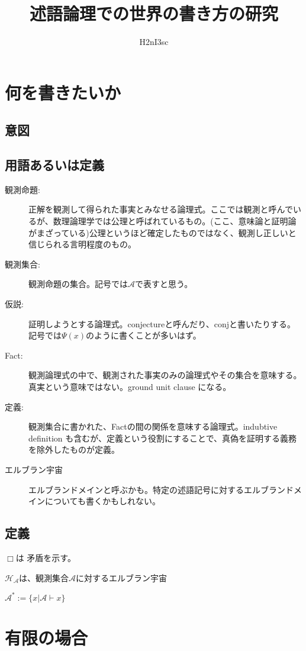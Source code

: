 \documentclass[10pt, oneside]{jarticle}   	%
\title{述語論理での世界の書き方の研究}
\author{H2nI3sc}
\theoremstyle{definition}
\newcommand{\cont}{\Box}
\newcommand{\clos}[1]{\mathcal{#1}^{*}}
\begin{document}
\maketitle

\section{何を書きたいか}
\subsection{意図}


\subsection{用語あるいは定義}
\begin{description}
\item[観測命題:] 正解を観測して得られた事実とみなせる論理式。ここでは観測と呼んでいるが、数理論理学では公理と呼ばれているもの。(ここ、意味論と証明論がまざっている)公理というほど確定したものではなく、観測し正しいと信じられる言明程度のもの。
\item[観測集合:] 観測命題の集合。記号では$\mathcal{A}$で表すと思う。
\item[仮説:] 証明しようとする論理式。conjectureと呼んだり、conjと書いたりする。記号では$\Psi(x)$のように書くことが多いはず。
\item[Fact:] 観測論理式の中で、観測された事実のみの論理式やその集合を意味する。真実という意味ではない。ground unit clause になる。
\item[定義:] 観測集合に書かれた、Factの間の関係を意味する論理式。indubtive definition も含むが、定義という役割にすることで、真偽を証明する義務を除外したものが定義。
\item[エルブラン宇宙] エルブランドメインと呼ぶかも。特定の述語記号に対するエルブランドメインについても書くかもしれない。
\end{description}

\subsection{定義}

$\cont$は 矛盾を示す。

$\mathcal{H_{\mathcal{A}}}$は、観測集合$\mathcal{A}$に対するエルブラン宇宙

$\clos{A} := \{x | \mathcal{A} \vdash x\}$



\section{有限の場合}
\end{document}

